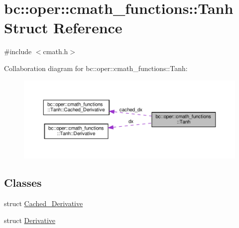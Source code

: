 \hypertarget{structbc_1_1oper_1_1cmath__functions_1_1Tanh}{}\section{bc\+:\+:oper\+:\+:cmath\+\_\+functions\+:\+:Tanh Struct Reference}
\label{structbc_1_1oper_1_1cmath__functions_1_1Tanh}


{\ttfamily \#include $<$cmath.\+h$>$}



Collaboration diagram for bc\+:\+:oper\+:\+:cmath\+\_\+functions\+:\+:Tanh\+:\nopagebreak
\begin{figure}[H]
\begin{center}
\leavevmode
\includegraphics[width=350pt]{structbc_1_1oper_1_1cmath__functions_1_1Tanh__coll__graph}
\end{center}
\end{figure}
\subsection*{Classes}
\begin{DoxyCompactItemize}
\item 
struct \hyperlink{structbc_1_1oper_1_1cmath__functions_1_1Tanh_1_1Cached__Derivative}{Cached\+\_\+\+Derivative}
\item 
struct \hyperlink{structbc_1_1oper_1_1cmath__functions_1_1Tanh_1_1Derivative}{Derivative}
\end{DoxyCompactItemize}
